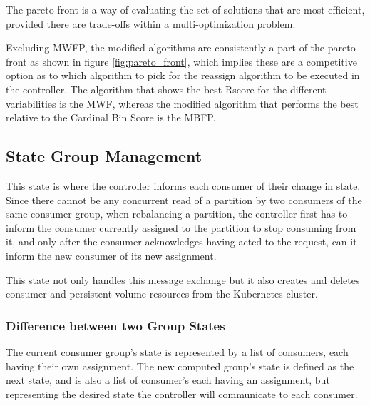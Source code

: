 The pareto front is a way of evaluating the set of solutions that are most
efficient, provided there are trade-offs within a multi-optimization problem.

Excluding MWFP, the modified algorithms are consistently a part of the pareto
front as shown in figure \ref{fig:pareto_front}, which implies these are a
competitive option as to which algorithm to pick for the reassign algorithm to
be executed in the controller. The algorithm that shows the best Rscore for the
different variabilities is the MWF, whereas the modified algorithm that performs
the best relative to the Cardinal Bin Score is the MBFP.

\subsection{State Group Management}

This state is where the controller informs each consumer of their change in
state. Since there cannot be any concurrent read of a partition by two consumers
of the same consumer group, when rebalancing a partition, the controller first
has to inform the consumer currently assigned to the partition to stop consuming
from it, and only after the consumer acknowledges having acted to the request,
can it inform the new consumer of its new assignment.

This state not only handles this message exchange but it also creates and
deletes consumer and persistent volume resources from the Kubernetes cluster. 

\subsubsection{Difference between two Group States}

The current consumer group's state is represented by a list of consumers, each
having their own assignment. The new computed group's state is defined as the
next state, and is also a list of consumer's each having an assignment, but
representing the desired state the controller will communicate to each consumer.

